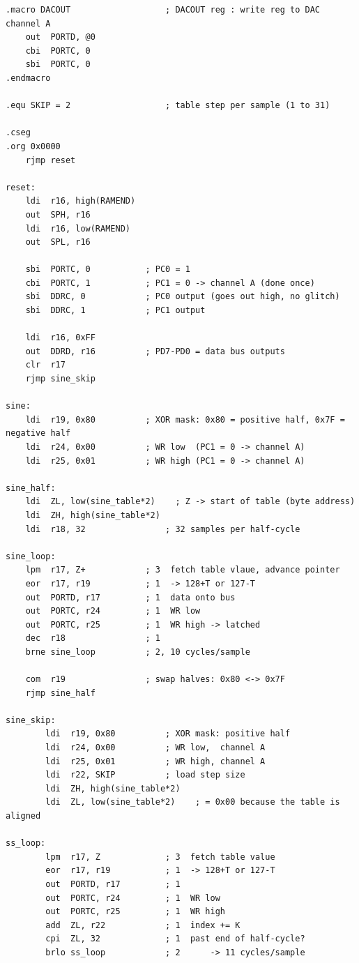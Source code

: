 \documentclass[11pt]{article}
\begin{document}
\begin{lstlisting}[language=avrasm,caption={Program 2. Table-based sine wave with a fixed or variable table step.},label={code:sine}]
.macro DACOUT                   ; DACOUT reg : write reg to DAC channel A
    out  PORTD, @0
    cbi  PORTC, 0
    sbi  PORTC, 0
.endmacro

.equ SKIP = 2                   ; table step per sample (1 to 31)

.cseg
.org 0x0000
    rjmp reset

reset:
    ldi  r16, high(RAMEND)
    out  SPH, r16
    ldi  r16, low(RAMEND)
    out  SPL, r16

    sbi  PORTC, 0           ; PC0 = 1
    cbi  PORTC, 1           ; PC1 = 0 -> channel A (done once)
    sbi  DDRC, 0            ; PC0 output (goes out high, no glitch)
    sbi  DDRC, 1            ; PC1 output

    ldi  r16, 0xFF
    out  DDRD, r16          ; PD7-PD0 = data bus outputs
    clr  r17
    rjmp sine_skip

sine:
    ldi  r19, 0x80          ; XOR mask: 0x80 = positive half, 0x7F = negative half
    ldi  r24, 0x00          ; WR low  (PC1 = 0 -> channel A)
    ldi  r25, 0x01          ; WR high (PC1 = 0 -> channel A)

sine_half:
    ldi  ZL, low(sine_table*2)    ; Z -> start of table (byte address)
    ldi  ZH, high(sine_table*2)
    ldi  r18, 32                ; 32 samples per half-cycle

sine_loop:
    lpm  r17, Z+            ; 3  fetch table vlaue, advance pointer
    eor  r17, r19           ; 1  -> 128+T or 127-T
    out  PORTD, r17         ; 1  data onto bus
    out  PORTC, r24         ; 1  WR low
    out  PORTC, r25         ; 1  WR high -> latched
    dec  r18                ; 1
    brne sine_loop          ; 2, 10 cycles/sample

    com  r19                ; swap halves: 0x80 <-> 0x7F
    rjmp sine_half

sine_skip:
        ldi  r19, 0x80          ; XOR mask: positive half
        ldi  r24, 0x00          ; WR low,  channel A
        ldi  r25, 0x01          ; WR high, channel A
        ldi  r22, SKIP          ; load step size
        ldi  ZH, high(sine_table*2)
        ldi  ZL, low(sine_table*2)    ; = 0x00 because the table is aligned

ss_loop:
        lpm  r17, Z             ; 3  fetch table value
        eor  r17, r19           ; 1  -> 128+T or 127-T
        out  PORTD, r17         ; 1
        out  PORTC, r24         ; 1  WR low
        out  PORTC, r25         ; 1  WR high
        add  ZL, r22            ; 1  index += K
        cpi  ZL, 32             ; 1  past end of half-cycle?
        brlo ss_loop            ; 2      -> 11 cycles/sample


\end{lstlisting}
\end{document}
